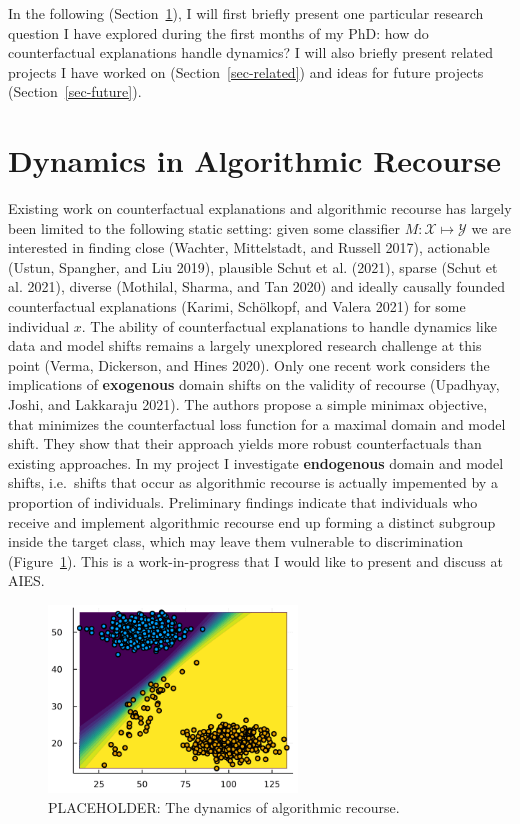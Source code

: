 \documentclass[
]{acmconf}
\begin{document}
In the following (Section~\ref{sec-main}), I will first briefly present
one particular research question I have explored during the first months
of my PhD: how do counterfactual explanations handle dynamics? I will
also briefly present related projects I have worked on
(Section~\ref{sec-related}) and ideas for future projects
(Section~\ref{sec-future}).

\hypertarget{sec-main}{%
\section{Dynamics in Algorithmic Recourse}\label{sec-main}}

Existing work on counterfactual explanations and algorithmic recourse
has largely been limited to the following static setting: given some
classifier \(M: \mathcal{X} \mapsto \mathcal{Y}\) we are interested in
finding close (Wachter, Mittelstadt, and Russell 2017), actionable
(Ustun, Spangher, and Liu 2019), plausible Schut et al. (2021), sparse
(Schut et al. 2021), diverse (Mothilal, Sharma, and Tan 2020) and
ideally causally founded counterfactual explanations (Karimi, Schölkopf,
and Valera 2021) for some individual \(x\). The ability of
counterfactual explanations to handle dynamics like data and model
shifts remains a largely unexplored research challenge at this point
(Verma, Dickerson, and Hines 2020). Only one recent work considers the
implications of \textbf{exogenous} domain shifts on the validity of
recourse (Upadhyay, Joshi, and Lakkaraju 2021). The authors propose a
simple minimax objective, that minimizes the counterfactual loss
function for a maximal domain and model shift. They show that their
approach yields more robust counterfactuals than existing approaches. In
my project I investigate \textbf{endogenous} domain and model shifts,
i.e.~shifts that occur as algorithmic recourse is actually impemented by
a proportion of individuals. Preliminary findings indicate that
individuals who receive and implement algorithmic recourse end up
forming a distinct subgroup inside the target class, which may leave
them vulnerable to discrimination (Figure~\ref{fig-dynamics}). This is a
work-in-progress that I would like to present and discuss at AIES.

\begin{figure}

{\centering \includegraphics[width=2.60417in,height=\textheight]{www/dynamics.png}

}

\caption{\label{fig-dynamics}PLACEHOLDER: The dynamics of algorithmic
recourse.}

\end{figure}
\end{document}
